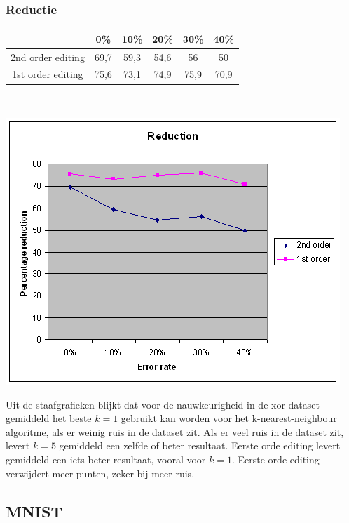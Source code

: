 \documentclass{article}
\begin{document}
\subsubsection{Reductie}
\begin{tabular}{|c|c|c|c|c|c|}  \hline
&	0\% &	10\% & 	20\%	 & 30\%	 & 40\% \\ \hline
2nd order editing &	69,7 &	59,3 &	54,6 & 	56 &	50 \\
1st order editing &	75,6 &	73,1 &	74,9 &	75,9 &	70,9 \\ \hline
\end{tabular} \\
\begin{center} \includegraphics[scale=0.7]{xor_reduction} \end{center}

Uit de staafgrafieken blijkt dat voor de nauwkeurigheid in de xor-dataset gemiddeld het beste $k=1$ gebruikt kan worden voor het k-nearest-neighbour algoritme, als er weinig ruis in de dataset zit.  Als er veel ruis in de dataset zit, levert $k=5$ gemiddeld een zelfde of beter resultaat. Eerste orde editing levert gemiddeld een iets beter resultaat, vooral voor $k=1$. Eerste orde editing verwijdert meer punten, zeker bij meer ruis. 

\subsection{MNIST}
\end{document}
